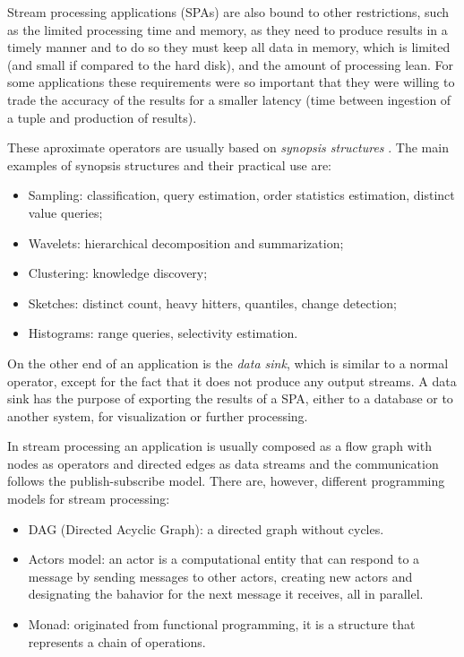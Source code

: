 \documentclass[ppgc,diss,english]{iiufrgs}
\begin{document}
Stream processing applications (SPAs) are also bound to other restrictions, such as the limited processing time and memory, as they need to produce results in a timely manner and to do so they must keep all data in memory, which is limited (and small if compared to the hard disk), and the amount of processing lean. For some applications these requirements were so important that they were willing to trade the accuracy of the results for a smaller latency (time between ingestion of a tuple and production of results).

These aproximate operators are usually based on \emph{synopsis structures} \cite{aggarwal2007survey}. The main examples of synopsis structures and their practical use are:

\begin{itemize}
\item Sampling: classification, query estimation, order statistics estimation, distinct value queries;
\item Wavelets: hierarchical decomposition and summarization;
\item Clustering: knowledge discovery;
\item Sketches: distinct count, heavy hitters, quantiles, change detection;
\item Histograms: range queries, selectivity estimation.
\end{itemize}

On the other end of an application is the \emph{data sink}, which is similar to a normal operator, except for the fact that it does not produce any output streams. A data sink has the purpose of exporting the results of a SPA, either to a database or to another system, for visualization or further processing.


In stream processing an application is usually composed as a flow graph with nodes as operators and directed edges as data streams and the communication follows the publish-subscribe model. There are, however, different programming models for stream processing:

\begin{itemize}
\item DAG (Directed Acyclic Graph): a directed graph without cycles.
\item Actors model: an actor is a computational entity that can respond to a message by sending messages to other actors, creating new actors and designating the bahavior for the next message it receives, all in parallel.
\item Monad: originated from functional programming, it is a structure that represents a chain of operations.
\end{itemize}
\end{document}
